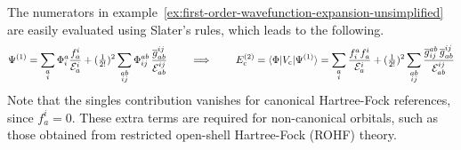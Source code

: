 \documentclass[11pt]{article}
\numberwithin{equation}{section}
\begin{document}
\begin{ex}
The numerators in example~\ref{ex:first-order-wavefunction-expansion-unsimplified} are easily evaluated using Slater's rules, which leads to the following.
\begin{align*}
\label{eq:first-order-wavefunction-expansion}
  \Psi ^{(1)}
=
  \sum_{\substack{a\\i}}
  \Phi _i^a
  \frac {f_a^i}{\mathcal{E}_a^i}
+
  (\tfrac{1}{2!})^2
  \sum_{\substack{ab\\ij}}
  \Phi _{ij}^{ab}\,
  \frac {\overline{g}_{ab}^{ij}}{\mathcal{E}_{ab}^{ij}}
\hspace{20pt}
\implies
\hspace{20pt}
  E_{\mathrm{c}}^{(2)}
=
  \langle\Phi |V_{\mathrm{c}}|\Psi ^{(1)}\rangle
=
  \sum_{\substack{a\\i}}
  \frac {f_i^af_a^i}{\mathcal{E}_a^i}
+
  (\tfrac{1}{2!})^2
  \sum_{\substack{ab\\ij}}
  \frac {\overline{g}_{ij}^{ab}\,\overline{g}_{ab}^{ij}}{\mathcal{E}_{ab}^{ij}}
\end{align*}
Note that the singles contribution vanishes for canonical Hartree-Fock references, since $f_a^i=0$.
These extra terms are required for non-canonical orbitals, such as those obtained from restricted open-shell Hartree-Fock (ROHF) theory.
\end{ex}
\end{document}
